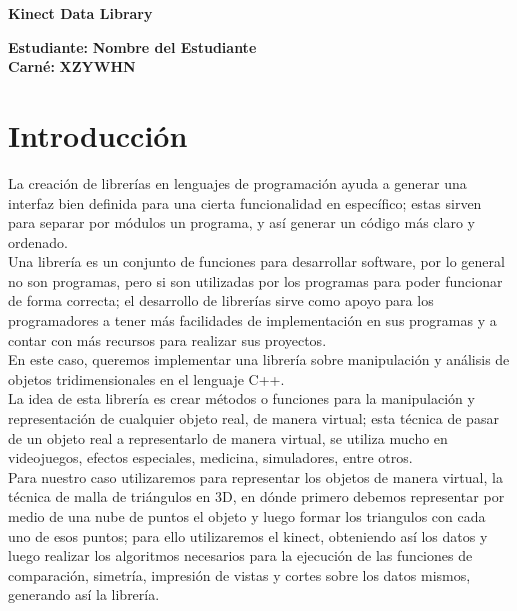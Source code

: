 \documentclass[letterpaper]{article}
\begin{document}
\vspace*{2cm}

\begin{center}
\Huge
\textbf{Kinect Data Library}
\vspace*{1cm}
\end{center}

\noindent
\small\baselineskip=14pt
\textbf{Estudiante:} \textbf{Nombre del Estudiante}\\
\textbf{Carné:} \textbf{XZYWHN}\\

\section{Introducción}
La creación de librerías en lenguajes de programación ayuda a generar una interfaz bien definida para una cierta funcionalidad en específico; estas sirven para separar por módulos un programa, y así generar un código más claro y ordenado.\\

Una librería es un conjunto de funciones para desarrollar software, por lo general no son programas, pero si son utilizadas por los programas para poder funcionar de forma correcta; el desarrollo de librerías sirve como apoyo para los programadores a tener más facilidades de implementación 
en sus programas y a contar con más recursos para realizar sus proyectos.\\

En este caso, queremos implementar una librería sobre manipulación y análisis de objetos tridimensionales
en el lenguaje C++.\\

La idea  de esta librería es crear métodos o funciones para la manipulación y representación 
de cualquier objeto real, de manera virtual; esta técnica de pasar de un objeto real a representarlo de manera virtual, se utiliza mucho en videojuegos, efectos especiales, medicina, simuladores, entre otros.\\

 Para nuestro caso utilizaremos para representar los objetos de manera virtual, la técnica de malla de triángulos en 3D, en dónde primero debemos representar por medio de una nube de puntos el objeto y luego formar los triangulos con cada uno de esos puntos; para ello utilizaremos el kinect, obteniendo así los datos y luego realizar los algoritmos necesarios para la ejecución de las funciones de comparación, simetría, impresión de vistas y cortes sobre los datos mismos, generando así la librería. 
\end{document}
